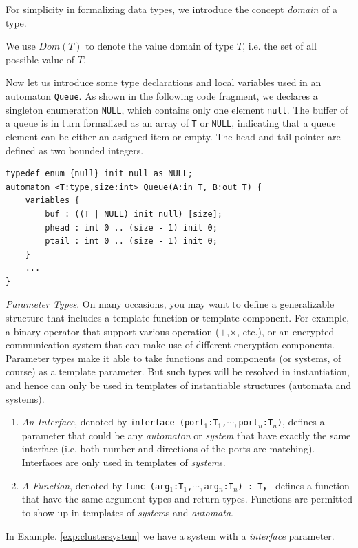 For simplicity in formalizing data types, we introduce the concept \emph{domain} of a type. 

\begin{formalization}[Domain]
    We use $Dom(T)$ to denote the value domain of type $T$, i.e. the set of all possible value of $T$.
\end{formalization}

\begin{example} Now let us introduce some type declarations and local variables used in an automaton \texttt{Queue}. As shown in the following code fragment, we declares a singleton enumeration \texttt{NULL}, which contains only one element \texttt{null}. The buffer of a queue is in turn formalized as an array of \texttt{T} or \texttt{NULL}, indicating that a queue element can be either an assigned item or empty. The head and tail pointer are defined as two bounded integers.
\begin{lstlisting}
typedef enum {null} init null as NULL;
automaton <T:type,size:int> Queue(A:in T, B:out T) {
    variables {
        buf : ((T | NULL) init null) [size];
        phead : int 0 .. (size - 1) init 0;
        ptail : int 0 .. (size - 1) init 0;
    }
    ...
}
\end{lstlisting}
\label{exp:typeinqueue}
\end{example}

\noindent\emph{Parameter Types}. On many occasions, you may want to define a generalizable structure that includes a template function or template component. For example, a binary operator that support various operation ($+$,$\times$, etc.), or an encrypted communication system that can make use of different encryption components. Parameter types make it able to take functions and components (or systems, of course) as a template parameter. But such types will be resolved in instantiation, and hence can only be used in templates of instantiable structures (automata and systems). 
\begin{enumerate}
    \item \emph{An Interface}, denoted by \texttt{interface (port$_1$:T$_1$,$\cdots,$port$_n$:T$_n$)}, defines a parameter that could be any \emph{automaton} or \emph{system} that have exactly the same interface (i.e. both number and directions of the ports are matching). Interfaces are only used in templates of \emph{system}s.
    \item \emph{A Function}, denoted by \texttt{func (arg$_1$:T$_1$,$\cdots, $arg$_n$:T$_n$) : T}， defines a function that have the same argument types and return types. Functions are permitted to show up in templates of \emph{system}s and \emph{automata}.
\end{enumerate}
In Example. \ref{exp:clustersystem} we have a system with a \emph{interface} parameter.

